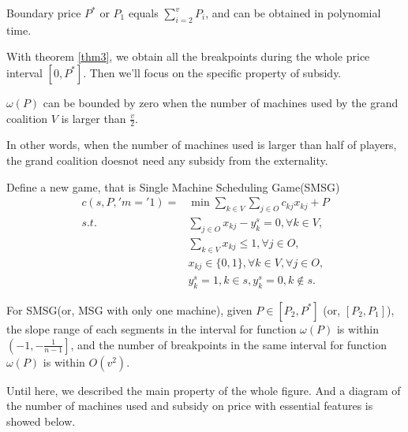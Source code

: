 \begin{thm}\label{thm3}
Boundary price $P^*$ or $P_1$ equals $\sum_{i=2}^v P_i$, and can be obtained in polynomial time.
\end{thm}

With theorem \ref{thm3}, we obtain all the breakpoints during the whole price interval $[0,P^*]$. Then we'll focus on the specific property of subsidy.

\begin{thm}\label{thm4}
$\omega(P)$ can be bounded by zero when the number of machines used by the grand coalition $V$ is larger than $\frac{v}{2}$.
\end{thm}

In other words, when the number of machines used is larger than half of players, the grand coalition doesnot need any subsidy from the externality.

Define a new game, that is Single Machine Scheduling Game(SMSG)
\[
\begin{aligned}
c(s,P,'m='1) = & {\min} \sum_{k\in V}\sum_{j\in O} {c_{kj} x_{kj} + P} \\
{s.t.}\quad & \sum_{j \in O} x_{kj}-y_k^s=0, \forall k \in V, \\
& \sum_{k\in V} x_{kj} \leq 1, \forall j \in O,  \\
& x_{kj} \in \{0,1\} , \forall k \in V, \forall j \in O,\\
& y_k^s=1, k \in s, y_k^s=0, k \notin s.
\end{aligned}
\]

\begin{thm}\label{thm5}
For SMSG(or, MSG with only one machine), given $P \in [P_2, P^*]$ (or, $[P_2,P_1]$),
the slope range of each segments in the interval for function $\omega(P)$ is within $\left(-1, -\frac{1}{n-1} \right]$, and the number of breakpoints in the same interval for function $\omega(P)$ is within $O(v^2)$.
\end{thm}

Until here, we described the main property of the whole figure.
And a diagram of the number of machines used and subsidy on price with essential features is showed below.

